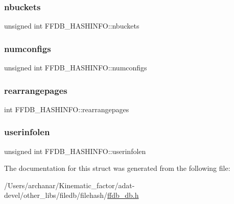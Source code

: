\subsubsection{\texorpdfstring{nbuckets}{nbuckets}}
{\footnotesize\ttfamily unsigned int F\+F\+D\+B\+\_\+\+H\+A\+S\+H\+I\+N\+F\+O\+::nbuckets}

\mbox{\label{structFFDB__HASHINFO_a6f03a772f4e63a8b7bed61705406f9b7}} 
\subsubsection{\texorpdfstring{numconfigs}{numconfigs}}
{\footnotesize\ttfamily unsigned int F\+F\+D\+B\+\_\+\+H\+A\+S\+H\+I\+N\+F\+O\+::numconfigs}

\mbox{\label{structFFDB__HASHINFO_a2399ac211531c76b33d9e34ed60a86c9}} 
\subsubsection{\texorpdfstring{rearrangepages}{rearrangepages}}
{\footnotesize\ttfamily int F\+F\+D\+B\+\_\+\+H\+A\+S\+H\+I\+N\+F\+O\+::rearrangepages}

\mbox{\label{structFFDB__HASHINFO_ab4185e8dc1347babf4e17733755073de}} 
\subsubsection{\texorpdfstring{userinfolen}{userinfolen}}
{\footnotesize\ttfamily unsigned int F\+F\+D\+B\+\_\+\+H\+A\+S\+H\+I\+N\+F\+O\+::userinfolen}



The documentation for this struct was generated from the following file\+:\begin{DoxyCompactItemize}
\item 
/\+Users/archanar/\+Kinematic\+\_\+factor/adat-\/devel/other\+\_\+libs/filedb/filehash/\mbox{\hyperlink{adat-devel_2other__libs_2filedb_2filehash_2ffdb__db_8h}{ffdb\+\_\+db.\+h}}\end{DoxyCompactItemize}
